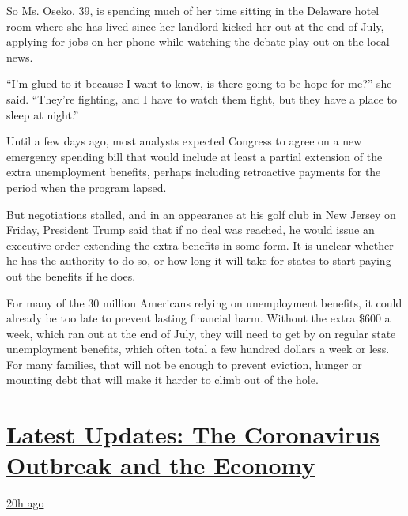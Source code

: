 So Ms. Oseko, 39, is spending much of her time sitting in the Delaware
hotel room where she has lived since her landlord kicked her out at the
end of July, applying for jobs on her phone while watching the debate
play out on the local news.

``I'm glued to it because I want to know, is there going to be hope for
me?'' she said. ``They're fighting, and I have to watch them fight, but
they have a place to sleep at night.''

Until a few days ago, most analysts expected Congress to agree on a new
emergency spending bill that would include at least a partial extension
of the extra unemployment benefits, perhaps including retroactive
payments for the period when the program lapsed.

But negotiations stalled, and in an appearance at his golf club in New
Jersey on Friday, President Trump said that if no deal was reached, he
would issue an executive order extending the extra benefits in some
form. It is unclear whether he has the authority to do so, or how long
it will take for states to start paying out the benefits if he does.

For many of the 30 million Americans relying on unemployment benefits,
it could already be too late to prevent lasting financial harm. Without
the extra \$600 a week, which ran out at the end of July, they will need
to get by on regular state unemployment benefits, which often total a
few hundred dollars a week or less. For many families, that will not be
enough to prevent eviction, hunger or mounting debt that will make it
harder to climb out of the hole.

\hypertarget{latest-updates-the-coronavirus-outbreak-and-the-economy}{%
\section{\texorpdfstring{\href{https://www.nytimes.com/live/2020/08/07/business/stock-market-today-coronavirus?action=click\&pgtype=Article\&state=default\&region=MAIN_CONTENT_1\&context=storylines_live_updates}{Latest
Updates: The Coronavirus Outbreak and the
Economy}}{Latest Updates: The Coronavirus Outbreak and the Economy}}\label{latest-updates-the-coronavirus-outbreak-and-the-economy}}

\href{https://www.nytimes.com/live/2020/08/07/business/stock-market-today-coronavirus?action=click\&pgtype=Article\&state=default\&region=MAIN_CONTENT_1\&context=storylines_live_updates\#wealthy-families-are-throwing-a-lifeline-to-distressed-businesses}{20h
ago}

